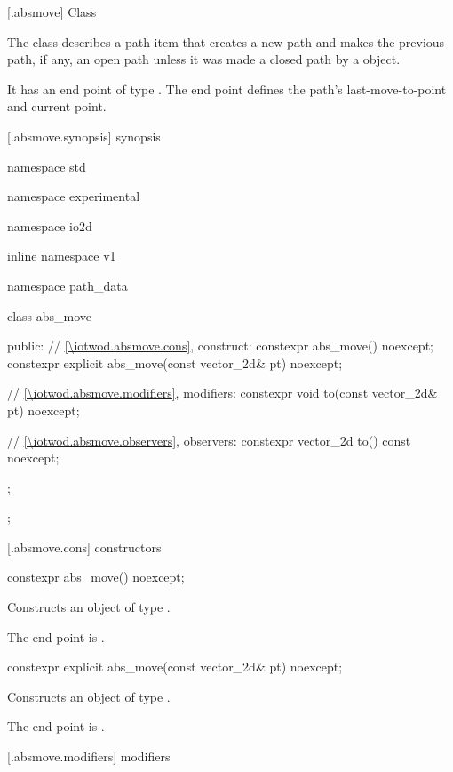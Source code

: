 [\iotwod.absmove] {Class }

\pnum
{}
The class  describes a path item that creates a new path and makes the previous path, if any, an open path unless it was made a closed path by a  object.

\pnum
It has an end point of type . The end point defines the path's last-move-to-point and current point.

 [\iotwod.absmove.synopsis] { synopsis}

\begin{codeblock}
namespace std { namespace experimental { namespace io2d { inline namespace v1 {
  namespace path_data {
    class abs_move {
    public:
      // \ref{\iotwod.absmove.cons}, construct:
      constexpr abs_move() noexcept;
      constexpr explicit abs_move(const vector_2d& pt) noexcept;

      // \ref{\iotwod.absmove.modifiers}, modifiers:
      constexpr void to(const vector_2d& pt) noexcept;

      // \ref{\iotwod.absmove.observers}, observers:
      constexpr vector_2d to() const noexcept;
    };
  };
} } } }
\end{codeblock}

 [\iotwod.absmove.cons] { constructors}

\begin{itemdecl}
constexpr abs_move() noexcept;
\end{itemdecl}
\begin{itemdescr}
\pnum
\effects
Constructs an object of type .

\pnum
The end point is .
\end{itemdescr}

\begin{itemdecl}
constexpr explicit abs_move(const vector_2d& pt) noexcept;
\end{itemdecl}
\begin{itemdescr}
\pnum
\effects
Constructs an object of type .

\pnum
The end point is .
\end{itemdescr}

 [\iotwod.absmove.modifiers]{ modifiers}

